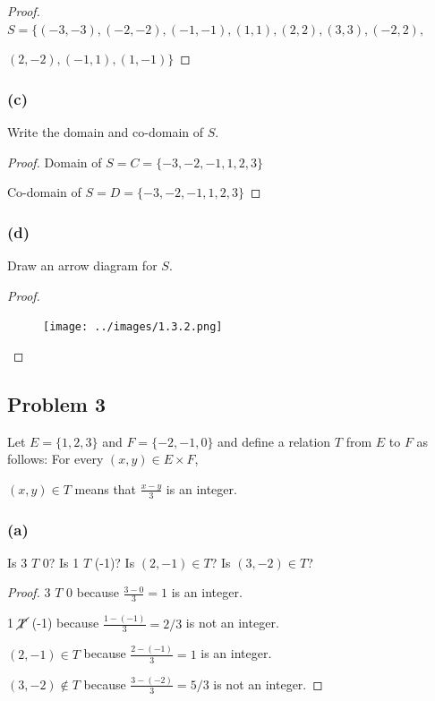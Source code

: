 \documentclass[14pt]{extarticle}
\newcommand{\dps}{\displaystyle}
\begin{document}
\begin{proof}
    $S = \{(-3, -3), (-2, -2), (-1, -1), (1, 1), (2, 2), (3, 3), (-2, 2),$

    $(2, -2), (-1, 1), (1, -1)\}$
\end{proof}

\subsubsection{(c)}
Write the domain and co-domain of $S$.

\begin{proof}
    Domain of $S = C = \{-3, -2, -1, 1, 2, 3\}$

    Co-domain of $S = D = \{-3, -2, -1, 1, 2, 3\}$
\end{proof}

\subsubsection{(d)}
Draw an arrow diagram for $S$.

\begin{proof}
    \begin{figure}[ht!]
        \centering
        \texttt{[image: ../images/1.3.2.png]}
    \end{figure}
\end{proof}

\subsection{Problem 3}
Let $E = \{1, 2, 3\}$ and $F = \{-2, -1, 0\}$ and define a relation $T$ from
$E$ to $F$ as follows: For every $(x, y) \in E \times F$,

\begin{center}
    $(x, y) \in T$ means that $\dps\frac{x-y}{3}$ is an integer.
\end{center}

\subsubsection{(a)}
Is 3 $T$ 0? Is 1 $T$ (-1)? Is $(2, -1) \in T$? Is $(3, -2) \in T$?

\begin{proof}
    3 $T$ 0 because $\dps\frac{3-0}{3} = 1$ is an integer.

    1 $\cancel{T}$ (-1) because $\dps\frac{1-(-1)}{3} = 2/3$ is not an integer.

    $(2, -1) \in T$ because $\dps\frac{2-(-1)}{3} = 1$ is an integer.

    $(3, -2) \notin T$ because $\dps\frac{3-(-2)}{3} = 5/3$ is not an integer.
\end{proof}
\end{document}

